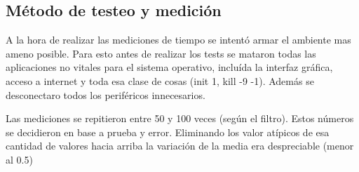 \subsection*{Método de testeo y medición}

	A la hora de realizar las mediciones de tiempo se intentó armar el ambiente mas
ameno posible. Para esto antes de realizar los tests se mataron todas las aplicaciones
no vitales para el sistema operativo, incluída la interfaz gráfica, acceso a internet y
toda esa clase de cosas (init 1, kill -9 -1). Además se desconectaro todos los periféricos
innecesarios.

	Las mediciones se repitieron entre 50 y 100 veces (según el filtro). Estos números se
decidieron en base a prueba y error. Eliminando los valor atípicos de esa cantidad
de valores hacia arriba la variación de la media era despreciable (menor al 0.5)

	



